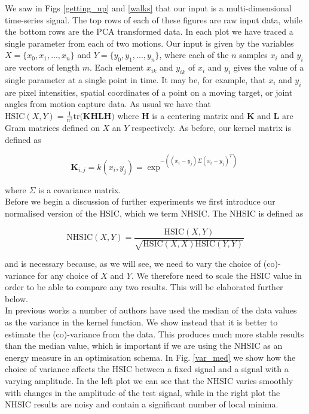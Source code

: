 We saw in Figs \ref{getting_up} and \ref{walks} that our input is a multi-dimensional time-series signal. The top rows of each of these figures are raw input data, while the bottom rows are the PCA transformed data. In each plot we have traced a single parameter from each of two motions. Our input is given by the variables $X = \{x_0, x_1, ..., x_n\}$ and $Y = \{y_0, y_1, ..., y_n\}$, where each of the $n$ samples $x_i$ and $y_i$ are vectors of length $m$. Each element $x_{ik}$ and $y_{ik}$ of $x_i$ and $y_i$ gives the value of a single parameter at a single point in time. It may be, for example, that $x_i$ and $y_i$ are pixel intensities, spatial coordinates of a point on a moving target, or joint angles from motion capture data. As usual we have that $\text{HSIC}(X, Y) = \frac{1}{n^2}\text{tr}\textbf{(KHLH)}$ where $\textbf{H}$ is a centering matrix and $\textbf{K}$ and $\textbf{L}$ are Gram matrices defined on $X$ an $Y$ respectively. As before, our kernel matrix is defined as

\begin{equation}
\textbf{K}_{i,j} = k(x_i,y_j) = \exp^{-((x_i-y_j)\Sigma(x_i-y_j)^T)}
\end{equation}

\noindent where $\Sigma$ is a covariance matrix.\\

Before we begin a discussion of further experiments we first introduce our normalised version of the HSIC, which we term NHSIC. The NHSIC is defined as 

\begin{equation}
\text{NHSIC}(X,Y) = \frac{\text{HSIC}(X,Y)}{\sqrt{\text{HSIC}(X,X)\text{HSIC}(Y,Y)}}
\end{equation}

\noindent and is necessary because, as we will see, we need to vary the choice of (co)-variance for any choice of $X$ and $Y$. We therefore need to scale the HSIC value in order to be able to compare any two results. This will be elaborated further below. \\

In previous works a number of authors have used the median of the data values as the variance in the kernel function. We show instead that it is better to estimate the (co)-variance from the data. This produces much more stable results than the median value, which is important if we are using the NHSIC as an energy measure in an optimisation schema. In Fig. \ref{var_med} we show how the choice of variance affects the HSIC between a fixed signal and a signal with a varying amplitude. In the left plot we can see that the NHSIC varies smoothly with changes in the amplitude of the test signal, while in the right plot the NHSIC results are noisy and contain a significant number of local minima.\\

